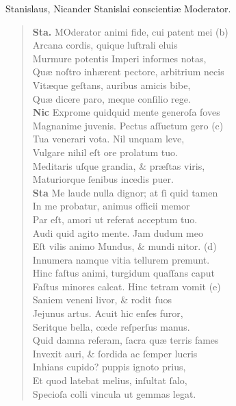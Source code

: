 \documentclass[a4paper,12pt]{article}
\begin{document}
Stanislaus, Nicander Stanislai conscientiæ Moderator.
\begin{verse}
\textbf{Sta.} MOderator animi fide, cui patent mei (b)\footnotemark\\[0pt]
Arcana cordis, quique luſtrali eluis\\[0pt]
Murmure potentis Imperi informes notas,\\[0pt]
Quæ noſtro inhærent pectore, arbitrium necis\\[0pt]
Vitæque geſtans, auribus amicis bibe,\\[0pt]
Quæ dicere paro, meque conſilio rege.\\[0pt]
\textbf{Nic} Exprome quidquid mente generoſa foves\\[0pt]
Magnanime juvenis. Pectus aſſuetum gero (c)\footnotemark\\[0pt]
Tua venerari vota. Nil unquam leve,\\[0pt]
Vulgare nihil eſt ore prolatum tuo.\\[0pt]
Meditaris uſque grandia, \& præſtas viris,\\[0pt]
Maturiorque ſenibus incedis puer.\\[0pt]
\textbf{Sta} Me laude nulla dignor; at ſi quid tamen\\[0pt]
In me probatur, animus officii memor\\[0pt]
Par eſt, amori ut referat acceptum tuo.\\[0pt]
Audi quid agito mente. Jam dudum meo\\[0pt]
Eſt vilis animo Mundus, \& mundi nitor. (d)\footnotemark\\[0pt]
Innumera namque vitia tellurem premunt.\\[0pt]
Hinc faſtus animi, turgidum quaſſans caput\\[0pt]
Faſtus minores calcat. Hinc tetram vomit (e)\footnotemark\\[0pt]
Saniem veneni livor, \& rodit ſuos\\[0pt]
Jejunus artus. Acuit hic enſes furor,\\[0pt]
Seritque bella, cœde reſperſus manus.\\[0pt]
Quid damna referam, ſacra quæ terris fames\\[0pt]
Invexit auri, \& ſordida ac ſemper lucris\\[0pt]
Inhians cupido? puppis ignoto prius,\\[0pt]
Et quod latebat melius, inſultat ſalo,\\[0pt]
Specioſa colli vincula ut gemmas legat.\\[0pt]

\end{verse}
\end{document}
